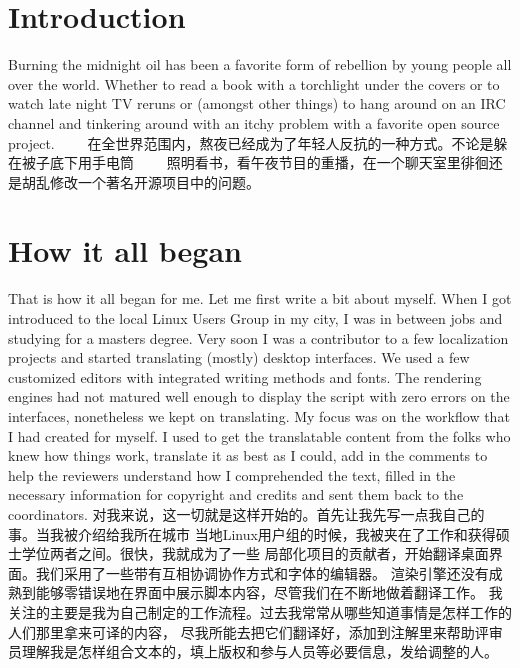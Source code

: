 

\section*{Introduction}

Burning the midnight oil has been a favorite form of rebellion by young people
all over the world. Whether to read a book with a torchlight under the covers or
to watch late night TV reruns or (amongst other things) to hang around on an IRC
channel and tinkering around with an itchy problem with a favorite open source
project. 
　　在全世界范围内，熬夜已经成为了年轻人反抗的一种方式。不论是躲在被子底下用手电筒
　　照明看书，看午夜节目的重播，在一个聊天室里徘徊还是胡乱修改一个著名开源项目中的问题。
\section*{How it all began}

That is how it all began for me. Let me first write a bit about myself. When I
got introduced to the local Linux Users Group in my city, I was in between jobs
and studying for a masters degree. Very soon I was a contributor to a few
localization projects and started translating (mostly) desktop interfaces. We
used a few customized editors with integrated writing methods and fonts. The
rendering engines had not matured well enough to display the script with zero
errors on the interfaces, nonetheless we kept on translating. My focus was on
the workflow that I had created for myself. I used to get the translatable
content from the folks who knew how things work, translate it as best as I
could, add in the comments to help the reviewers understand how I comprehended
the text, filled in the necessary information for copyright and credits and sent
them back to the coordinators.
对我来说，这一切就是这样开始的。首先让我先写一点我自己的事。当我被介绍给我所在城市
当地Linux用户组的时候，我被夹在了工作和获得硕士学位两者之间。很快，我就成为了一些
局部化项目的贡献者，开始翻译桌面界面。我们采用了一些带有互相协调协作方式和字体的编辑器。
渲染引擎还没有成熟到能够零错误地在界面中展示脚本内容，尽管我们在不断地做着翻译工作。
我关注的主要是我为自己制定的工作流程。过去我常常从哪些知道事情是怎样工作的人们那里拿来可译的内容，
尽我所能去把它们翻译好，添加到注解里来帮助评审员理解我是怎样组合文本的，填上版权和参与人员等必要信息，发给调整的人。
